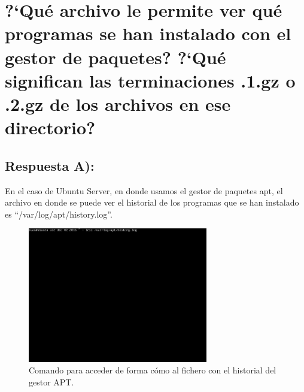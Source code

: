 \maketitle %

\newpage %

\tableofcontents %

\listoffigures

\listoftables

\newpage

\section{?`Qué archivo le permite ver qué programas se han instalado con el gestor de paquetes? ?`Qué significan las terminaciones .1.gz o .2.gz de los archivos en ese directorio?}
\subsection{Respuesta A):}

En el caso de Ubuntu Server, en donde usamos el gestor de paquetes apt, el archivo en donde se puede ver el historial de los programas que se han instalado es ``/var/log/apt/history.log''. \cite{debianAPTLOG}

\begin{figure}[H]
	\begin{center}
		\includegraphics[width=0.7\textwidth]{Imagenes/Comando_acceso_historial_apt}
		\caption{Comando para acceder de forma cómo al fichero con el historial del gestor APT.} \label{fig:1}
	\end{center}
\end{figure}

